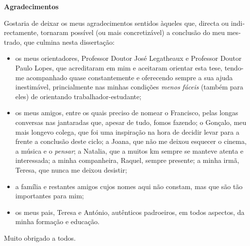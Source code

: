 
\cleardoublepage\thispagestyle{plain}

\begin{otherlanguage}{portuguese}
  \textbf{\Large Agradecimentos}

  Gostaria de deixar os meus agradecimentos sentidos àqueles que, directa ou indirectamente, tornaram possível (ou mais concretizável) a conclusão do meu mestrado, que culmina nesta dissertação:
  \begin{itemize}
    \item os meus orientadores, Professor Doutor José Legatheaux e Professor Doutor Paulo Lopes, que acreditaram em mim e aceitaram orientar esta tese, tendo-me acompanhado quase constantemente e oferecendo sempre a sua ajuda inestimável, princialmente nas minhas condições \emph{menos fáceis} (também para eles) de orientando trabalhador-estudante;
    \item os meus amigos, entre os quais preciso de nomear o Francisco, pelas longas conversas nas jantaradas que, apesar de tudo, fomos fazendo; o Gonçalo, meu mais longevo colega, que foi uma inspiração na hora de decidir levar para a frente a conclusão deste ciclo; a Joana, que não me deixou esquecer o cinema, a música e o \emph{pensar}; a Natalia, que a muitos km sempre se manteve atenta e interessada; a minha companheira, Raquel, sempre presente; a minha irmã, Teresa, que nunca me deixou desistir;
    \item a família e restantes amigos cujos nomes aqui não constam, mas que são tão importantes para mim;
    \item os meus pais, Teresa e António, autênticos padroeiros, em todos aspectos, da minha formação e educação.
  \end{itemize}

  Muito obrigado a todos.
\end{otherlanguage}
